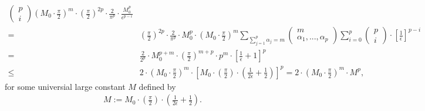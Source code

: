 \documentclass[11pt]{article}
\numberwithin{equation}{section}
\begin{document}
\begin{align*}
\begin{pmatrix}
		p\\
		i
	\end{pmatrix} \left(M_0\cdot  \frac{\pi}{2}\right)^{m}\cdot\left(\frac{\pi}{2}\right)^{2p}\cdot \frac{2}{\pi^{p}}\cdot \frac{M_0^p}{\epsilon^{p-i}} \\
	= & \left(\frac{\pi}{2}\right)^{2p}\cdot  \frac{2}{\pi^{p}}\cdot M_0^p\cdot \left(M_0\cdot \frac{\pi}{2}\right)^{m}  \sum_{\sum_{j=1}^p\alpha_j=m}\begin{pmatrix}
		m\\
		\alpha_1,...,\alpha_p
	\end{pmatrix}  \sum_{i=0}^p \begin{pmatrix}
		p\\
		i
	\end{pmatrix} \cdot\left[\frac{1}{\epsilon}\right]^{p-i}\\
	=& \frac{2}{2^{p}}\cdot M_0^{p+m}\cdot \left( \frac{\pi}{2}\right)^{m+p}  \cdot p^m   \cdot\left[\frac{1}{\epsilon}+1\right]^{p}\\
	\leq & 2\cdot \left(M_0\cdot \frac{\pi}{2}\right)^m \cdot \left[M_0\cdot \left(\frac{\pi}{2}\right)\cdot \left(\frac{1}{2\epsilon}+\frac{1}{2}\right) \right]^{p}=2\cdot \left(M_0\cdot \frac{\pi}{2}\right)^m \cdot M^p,
\end{align*}
for some universial large constant $M$ defined by
\begin{align*}
	M:=M_0\cdot \left(\frac{\pi}{2}\right)\cdot \left(\frac{1}{2\epsilon}+\frac{1}{2}\right).
\end{align*}
\end{document}

